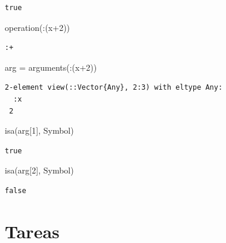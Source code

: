 \documentclass[
  a4paper,
]{scrreport}
\newenvironment{Shaded}{\begin{snugshade}}{\end{snugshade}}
\newcommand{\DataTypeTok}[1]{\textcolor[rgb]{0.68,0.00,0.00}{#1}}
\newcommand{\FloatTok}[1]{\textcolor[rgb]{0.68,0.00,0.00}{#1}}
\newcommand{\FunctionTok}[1]{\textcolor[rgb]{0.28,0.35,0.67}{#1}}
\newcommand{\NormalTok}[1]{\textcolor[rgb]{0.00,0.23,0.31}{#1}}
\newcommand{\OperatorTok}[1]{\textcolor[rgb]{0.37,0.37,0.37}{#1}}
\begin{document}
\begin{verbatim}
true
\end{verbatim}

\begin{Shaded}
\begin{Highlighting}[]
\FunctionTok{operation}\NormalTok{(}\OperatorTok{:}\NormalTok{(x}\OperatorTok{+}\FloatTok{2}\NormalTok{))}
\end{Highlighting}
\end{Shaded}

\begin{verbatim}
:+
\end{verbatim}

\begin{Shaded}
\begin{Highlighting}[]
\NormalTok{arg }\OperatorTok{=} \FunctionTok{arguments}\NormalTok{(}\OperatorTok{:}\NormalTok{(x}\OperatorTok{+}\FloatTok{2}\NormalTok{))}
\end{Highlighting}
\end{Shaded}

\begin{verbatim}
2-element view(::Vector{Any}, 2:3) with eltype Any:
  :x
 2
\end{verbatim}

\begin{Shaded}
\begin{Highlighting}[]
\FunctionTok{isa}\NormalTok{(arg[}\FloatTok{1}\NormalTok{], }\DataTypeTok{Symbol}\NormalTok{)}
\end{Highlighting}
\end{Shaded}

\begin{verbatim}
true
\end{verbatim}

\begin{Shaded}
\begin{Highlighting}[]
\FunctionTok{isa}\NormalTok{(arg[}\FloatTok{2}\NormalTok{], }\DataTypeTok{Symbol}\NormalTok{)}
\end{Highlighting}
\end{Shaded}

\begin{verbatim}
false
\end{verbatim}

\hypertarget{tareas}{%
\section{Tareas}\label{tareas}}
\end{document}
